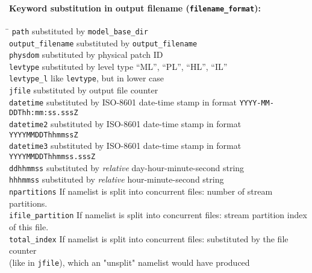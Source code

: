 \paragraph{Keyword substitution in output filename (\texttt{filename\_format}):}
\begin{tabbing}
\hspace*{0.4\textwidth} \= \kill
\texttt{path}              \>  substituted by \texttt{model\_base\_dir}                 \\
\texttt{output\_filename}  \>  substituted by \texttt{output\_filename}                 \\
\texttt{physdom}           \>  substituted by physical patch ID                         \\
\texttt{levtype}           \>  substituted by level type ``ML'', ``PL'', ``HL'', ``IL'' \\
\texttt{levtype\_l}        \>  like \texttt{levtype}, but in lower case                 \\
\texttt{jfile}             \>  substituted by output file counter                       \\
\texttt{datetime}          \>  substituted by ISO-8601 date-time stamp in format \texttt{YYYY-MM-DDThh:mm:ss.sssZ} \\
\texttt{datetime2}         \>  substituted by ISO-8601 date-time stamp in format \texttt{YYYYMMDDThhmmssZ}         \\
\texttt{datetime3}         \>  substituted by ISO-8601 date-time stamp in format \texttt{YYYYMMDDThhmmss.sssZ}     \\
\texttt{ddhhmmss}          \>  substituted by \emph{relative} day-hour-minute-second string \\
\texttt{hhhmmss}           \>  substituted by \emph{relative} hour-minute-second string     \\
\texttt{npartitions}       \>  If namelist is split into concurrent files: number of stream partitions.           \\
\texttt{ifile\_partition}  \>  If namelist is split into concurrent files: stream partition index of this file.   \\
\texttt{total\_index}      \>  If namelist is split into concurrent files: substituted by the file counter \\ 
                           \>  (like in \texttt{jfile}), which an "unsplit" namelist would have produced
\end{tabbing}

\newpage

